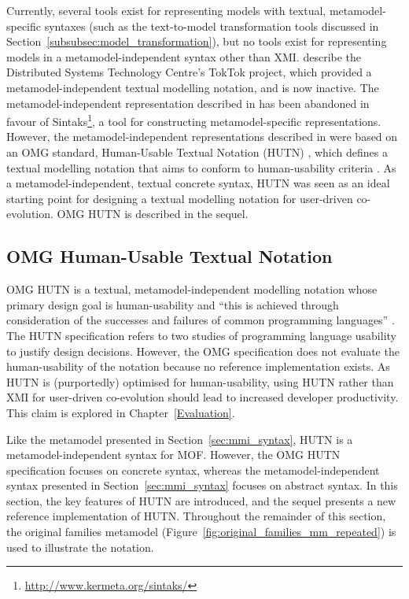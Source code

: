 Currently, several tools exist for representing models with textual, metamodel-specific syntaxes (such as the text-to-model transformation tools discussed in Section~\ref{subsubsec:model_transformation}), but no tools exist for representing models in a metamodel-independent syntax other than XMI. \cite{steel01hutn} describe the Distributed Systems Technology Centre's TokTok project, which provided a metamodel-independent textual modelling notation, and is now inactive. The metamodel-independent representation described in \cite{muller05hutn} has been abandoned in favour of Sintaks\footnote{\url{http://www.kermeta.org/sintaks/}}, a tool for constructing metamodel-specific representations. However, the metamodel-independent representations described in \cite{steel01hutn,muller05hutn} were based on an OMG standard, Human-Usable Textual Notation (HUTN) \cite{hutn}, which defines a textual modelling notation that aims to conform to human-usability criteria \cite{hutn}. As a metamodel-independent, textual concrete syntax, HUTN was seen as an ideal starting point for designing a textual modelling notation for user-driven co-evolution. OMG HUTN is described in the sequel.

\subsection{OMG Human-Usable Textual Notation}
\label{subsec:hutn}
OMG HUTN is a textual, metamodel-independent modelling notation whose primary design goal is human-usability and ``this is achieved through consideration of the successes and failures of common programming languages'' \cite[Section 2.2]{hutn}. The HUTN specification refers to two studies of programming language usability to justify design decisions. However, the OMG specification does not evaluate the human-usability of the notation because no reference implementation exists. As HUTN is (purportedly) optimised for human-usability, using HUTN rather than XMI for user-driven co-evolution should lead to increased developer productivity. This claim is explored in Chapter~\ref{Evaluation}.

Like the metamodel presented in Section~\ref{sec:mmi_syntax}, HUTN is a metamodel-independent syntax for MOF. However, the OMG HUTN specification focuses on concrete syntax, whereas the metamodel-independent syntax presented in Section~\ref{sec:mmi_syntax} focuses on abstract syntax. In this section, the key features of HUTN are introduced, and the sequel presents a new reference implementation of HUTN. Throughout the remainder of this section, the original families metamodel (Figure~\ref{fig:original_families_mm_repeated}) is used to illustrate the notation.


